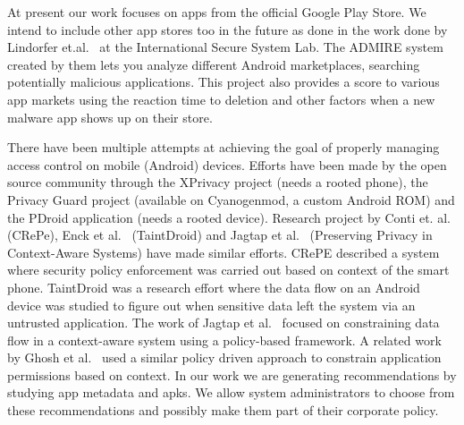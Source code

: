 At present our work focuses on apps from the official Google Play Store. We intend to include other app stores too in the future as done in the work done by Lindorfer et.al.~\cite{Lindorfer2014AndRadar} at the International Secure System Lab. The ADMIRE system created by them lets you analyze different Android marketplaces, searching potentially malicious applications. This project also provides a score to various app markets using the reaction time to deletion and other factors when a new malware app shows up on their store. 

There have been multiple attempts at achieving the goal of properly managing access control on mobile (Android) devices. Efforts have been made by the open source community through the XPrivacy project (needs a rooted phone), the Privacy Guard project (available on Cyanogenmod, a custom Android ROM) and the PDroid application (needs a rooted device). Research project by Conti et. al.~\cite{conti2011crepe} (CRePe), Enck et al.~\cite{enck2010taintdroid} (TaintDroid) and Jagtap et al.~\cite{Jagtap2011Privacy} (Preserving Privacy in Context-Aware Systems) have made similar efforts. CRePE described a system where security policy enforcement was carried out based on context of the smart phone. TaintDroid was a research effort where the data flow on an Android device was studied to figure out when sensitive data left the system via an untrusted application. The work of Jagtap et al.~\cite{Jagtap2011Privacy} focused on constraining data flow in a context-aware system using a policy-based framework. A related work by Ghosh et al.~\cite{ghosh2012privacy} used a similar policy driven approach to constrain application permissions based on context. In our work we are generating recommendations by studying app metadata and apks. We allow system administrators to choose from these recommendations and possibly make them part of their corporate policy.
